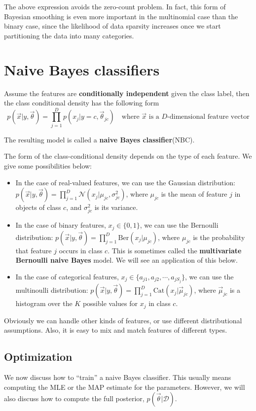 The above expression avoids the zero-count problem. In fact, this form of Bayesian smoothing is even more important in the multinomial case than the binary case, since the likelihood of data sparsity increases once we start partitioning the data into many categories.


\section{Naive Bayes classifiers}
\label{sec:NBC}
Assume the features are \textbf{conditionally independent} given the class label, then the class conditional density has the following form
\begin{equation}
p(\vec{x}|y,\vec{\theta})=\prod\limits_{j=1}^D p(x_j|y=c,\vec{\theta}_{jc}) \quad \text{where $\vec{x}$ is a $D$-dimensional feature vector}
\end{equation}

The resulting model is called a \textbf{naive Bayes classifier}(NBC).

The form of the class-conditional density depends on the type of each feature. We give some possibilities below:
\begin{itemize}
\item{In the case of real-valued features, we can use the Gaussian distribution: $p(\vec{x}|y,\vec{\theta})=\prod_{j=1}^D \mathcal{N}(x_j|\mu_{jc},\sigma_{jc}^2)$, where $\mu_{jc}$ is the mean of feature $j$ in objects of class $c$, and $\sigma_{jc}^2$ is its variance.}
\item{In the case of binary features, $x_j \in \{0,1\}$, we can use the Bernoulli distribution: $p(\vec{x}|y,\vec{\theta})=\prod_{j=1}^D \text{Ber}(x_j|\mu_{jc})$, where $\mu_{jc}$ is the probability that feature $j$ occurs in class $c$. This is sometimes called the \textbf{multivariate Bernoulli naive Bayes} model. We will see an application of this below.}
\item{In the case of categorical features, $x_j \in \{a_{j1},a_{j2},\cdots, a_{jS_j}\}$, we can use the multinoulli distribution: $p(\vec{x}|y,\vec{\theta})=\prod_{j=1}^D \text{Cat}(x_j|\vec{\mu}_{jc})$, where $\vec{\mu}_{jc}$ is a histogram over the $K$ possible values for $x_j$ in class $c$.}
\end{itemize}

Obviously we can handle other kinds of features, or use different distributional assumptions. Also, it is easy to mix and match features of different types.


\subsection{Optimization}
\label{sec:NBC-Optimization}
We now discuss how to “train” a naive Bayes classifier. This usually means computing the MLE or the MAP estimate for the parameters. However, we will also discuss how to compute the full posterior, $p(\vec{\theta}|\mathcal{D})$.

